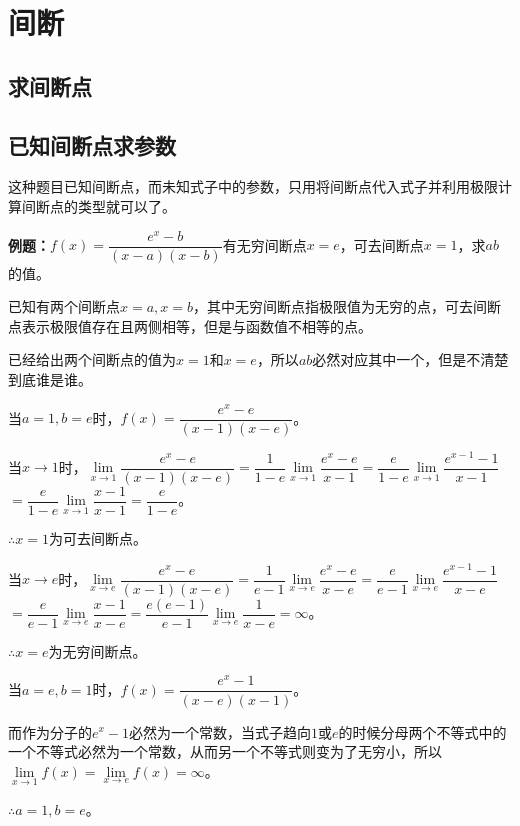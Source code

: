 \documentclass[UTF8, 12pt]{ctexart}
\begin{document}
\section{间断}

\subsection{求间断点}

\subsection{已知间断点求参数}

这种题目已知间断点，而未知式子中的参数，只用将间断点代入式子并利用极限计算间断点的类型就可以了。

\textbf{例题：}$f(x)=\dfrac{e^x-b}{(x-a)(x-b)}$有无穷间断点$x=e$，可去间断点$x=1$，求$ab$的值。

已知有两个间断点$x=a,x=b$，其中无穷间断点指极限值为无穷的点，可去间断点表示极限值存在且两侧相等，但是与函数值不相等的点。

已经给出两个间断点的值为$x=1$和$x=e$，所以$ab$必然对应其中一个，但是不清楚到底谁是谁。

当$a=1,b=e$时，$f(x)=\dfrac{e^x-e}{(x-1)(x-e)}$。\medskip

当$x\to 1$时，$\lim\limits_{x\to 1}\dfrac{e^x-e}{(x-1)(x-e)}$$=\dfrac{1}{1-e}\lim\limits_{x\to 1}\dfrac{e^x-e}{x-1}$$=\dfrac{e}{1-e}\lim\limits_{x\to 1}\dfrac{e^{x-1}-1}{x-1}$$=\dfrac{e}{1-e}\lim\limits_{x\to 1}\dfrac{x-1}{x-1}$$=\dfrac{e}{1-e}$。\medskip

$\therefore x=1$为可去间断点。\medskip

当$x\to e$时，$\lim\limits_{x\to e}\dfrac{e^x-e}{(x-1)(x-e)}$$=\dfrac{1}{e-1}\lim\limits_{x\to e}\dfrac{e^x-e}{x-e}$$=\dfrac{e}{e-1}\lim\limits_{x\to e}\dfrac{e^{x-1}-1}{x-e}$\medskip$=\dfrac{e}{e-1}\lim\limits_{x\to e}\dfrac{x-1}{x-e}$$=\dfrac{e(e-1)}{e-1}\lim\limits_{x\to e}\dfrac{1}{x-e}=\infty$。\medskip

$\therefore x=e$为无穷间断点。\medskip

当$a=e,b=1$时，$f(x)=\dfrac{e^x-1}{(x-e)(x-1)}$。\medskip

而作为分子的$e^x-1$必然为一个常数，当式子趋向$1$或$e$的时候分母两个不等式中的一个不等式必然为一个常数，从而另一个不等式则变为了无穷小，所以$\lim\limits_{x\to 1}f(x)=\lim\limits_{x\to e}f(x)=\infty$。

$\therefore a=1,b=e$。
\end{document}
